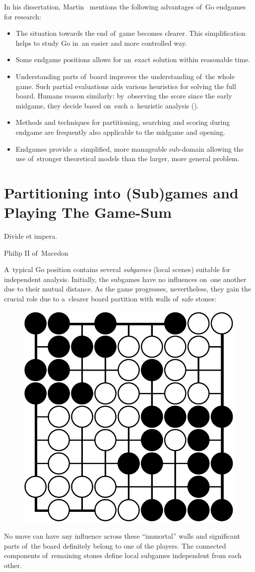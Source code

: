 In his dissertation, Martin~\Mueller{} mentions the following advantages of~Go endgames for research:
\begin{itemize}
  \item The situation towards the end of~game becomes clearer.
    This simplification helps to study Go in~an easier and more controlled way.
  \item Some endgame positions allows for an~exact solution within reasonable time.
  \item Understanding parts of~board improves the understanding of~the whole game.
    Such partial evaluations aids various heuristics for solving the full board.
    Humans reason similarly: by~observing the score since the early midgame, they decide based on~such a~heuristic analysis (\cite{Takagawa85}).
  \item Methods and techniques for partitioning, searching and scoring during endgame are frequently also applicable to the midgame and opening.
  \item Endgames provide a~simplified, more manageable sub-domain allowing the use of~stronger theoretical models than the larger, more general problem.
\end{itemize}

\section{Partitioning into (Sub)games and Playing The Game-Sum}
\epigraph{
  Divide et impera.
}{Philip II of~Macedon}
A~typical Go position contains several \emph{subgames} (local scenes) suitable for independent analysis.
Initially, the subgames have no influences on~one another due to their mutual distance.
As the game progresses, nevertheless, they gain the crucial role due to a~clearer board partition with walls of~safe stones:
\begin{figure}[H]
  \centering
  \includegraphics[width=.4\textwidth]{../img/late_endgame_Go_position_suited_for_exact_analysis.png}
  \label{fig:immortal-wall}
\end{figure}
No move can have any influence across these ``immortal'' walls and significant parts of~the board definitely belong to one of the players.
The connected components of~remaining stones define local subgames independent from each other.

